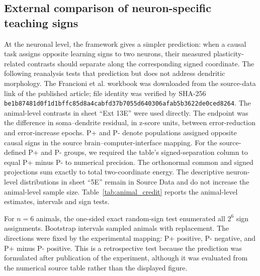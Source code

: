 \subsection{External comparison of neuron-specific teaching signs}
\label{note:animal_credit}

At the neuronal level, the framework gives a simpler prediction: when a
causal task assigns opposite learning signs to two neurons, their measured
plasticity-related contrasts should separate along the corresponding signed
coordinate. The following reanalysis tests that prediction but does not
address dendritic morphology.
The Francioni et al. workbook was downloaded from the source-data link of the
published article; file identity was verified by SHA-256
\texttt{be1b87481d0f1d1bffc85d8a4cabfd37b7055d640306afab5b3622de0ced8264}.
The animal-level contrasts in sheet ``Ext 13E'' were used directly. The endpoint was the difference in soma--dendrite residual, in z-score units, between error-reduction and error-increase epochs. P+ and P- denote populations assigned opposite causal signs in the source brain--computer-interface mapping. For the source-defined P+ and P- groups, we required the table's
signed-separation column to equal P+ minus P- to numerical precision. The orthonormal common and signed projections sum exactly to total
two-coordinate energy. The descriptive neuron-level distributions in sheet ``5E'' remain in Source Data and do not increase the animal-level sample size. Table~\ref{tab:animal_credit} reports the animal-level estimates, intervals and sign tests.

For $n=6$ animals, the one-sided exact random-sign test enumerated all $2^6$ sign
assignments. Bootstrap intervals sampled animals with replacement. The
directions were fixed by the experimental mapping: P+ positive, P- negative,
and P+ minus P- positive. This is a retrospective test because the prediction
was formulated after publication of the experiment, although it was evaluated
from the numerical source table rather than the displayed figure.
